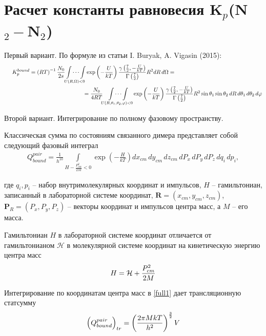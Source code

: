 \documentclass[12pt]{article}
\newcommand{\mf}{\mathbf}
\newcommand{\lb}{\left(}
\newcommand{\rb}{\right)}
\newcommand{\mH}{\mathcal{H}}
\newcommand{\intl}{\int\limits}
\newcommand{\idotsintl}{\idotsint\limits}
\begin{document}
\section*{Расчет константы равновесия K$_p$(N$_2-$N$_2$)}

Первый вариант. По формуле из статьи I. Buryak, A. Vigasin (2015):
\begin{gather}
	K_p^{bound} = \lb R T \rb^{-1} \frac{N_0}{2s} \idotsintl_{U \lb R, \Omega \rb < 0} \exp \lb - \frac{U}{kT} \rb \frac{ \gamma \lb \frac{7}{2}, - \frac{U}{kT} \rb}{\Gamma \lb \frac{7}{2} \rb } R^2 d R \, d \Omega = \hspace{5cm} \notag \\
	\hspace{5cm} = \frac{N_0}{4 R T} \idotsintl_{U \lb R, \theta_1, \theta_2, \varphi \rb < 0} \exp \lb - \frac{U}{k T} \rb \frac{ \gamma \lb \frac{7}{2}, - \frac{U}{k T} \rb}{\Gamma \lb \frac{7}{2} \rb} R^2 \sin \theta_1 \sin \theta_2 \, dR \, d \theta_1 \, d \theta_2 \, d \varphi \notag
\end{gather}

Второй вариант. Интегрирование по полному фазовому пространству. \par
Классическая сумма по состояниям связанного димера представляет собой следующий фазовый интеграл
\begin{gather}
		Q_{bound}^{pair} = \frac{1}{h^{10}} \intl_{H - \displaystyle \frac{P_{cm}^2}{2M} < 0} \exp \lb - \frac{H}{k T} \rb d x_{cm} \, d y_{cm} \, d z_{cm} \, d P_x \, d P_y \, d P_z \, d q_i \, d p_i, \label{full1} 
\end{gather}

где $q_i, p_i$ -- набор внутримолекулярных координат и импульсов, $H$ -- гамильтониан, записанный в лабораторной системе координат, $\mf{R} = \lb x_{cm}, y_{cm}, z_{cm} \rb$, $\mf{P}_R = \lb P_x, P_y, P_z \rb$ -- векторы координат и импульсов центра масс, а $M$ -- его масса. \par
Гамильтониан $H$ в лабораторной системе координат отличается от гамильтонианом $\mH$ в молекулярной системе координат на кинетическую энергию центра масс
\begin{gather}
		H = \mH + \frac{P_{cm}^2}{2 M} \notag
\end{gather}

Интегрирование по координатам центра масс в \eqref{full1} дает трансляционную статсумму
\begin{gather}
	\lb Q_{bound}^{pair} \rb_{tr} = \lb \frac{2 \pi M k T}{h^2} \rb^\frac{3}{2} V \notag
\end{gather}
\end{document}
